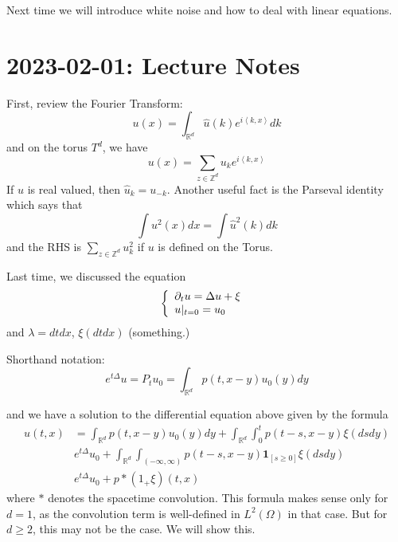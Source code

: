 \documentclass{article}
\def\R{\mathbb{R}} %
\def\Z{\mathbb{Z}} %
\begin{document}
Next time we will introduce white noise and how to deal with linear equations.
\section{2023-02-01: Lecture Notes}
First, review the Fourier Transform:
\begin{equation*}
  u(x) = \int_{\R^d } \hat{u}(k)e^{i \left\langle k,x \right\rangle} dk
\end{equation*}
and on the torus $T^{d}$, we have
\begin{equation*}
  u(x) = \sum_{z\in \Z^{d}} u_{k}e^{i \left\langle k,x \right\rangle}
\end{equation*}
If $u$ is real valued, then $\hat{u}_{k}=u_{-k}$. Another useful fact is the
Parseval identity which says that
\begin{equation*}
  \int u^{2}(x)dx =  
  \int \hat{u}^{2}(k)dk
\end{equation*}
and the RHS is $\sum_{z\in \Z^{d}}u_{k}^{2}$ if $u$ is defined on the Torus.

Last time, we discussed the equation
\begin{equation*}
  \left\{ \begin{array}{l@{\quad}l} \partial_{t}u =\Delta u+\xi \\
    u|_{t=0}=u_{0}\end{array}\right.
\end{equation*}
and $\lambda=dtdx$, $\xi(dtdx) $ (something.) 

Shorthand notation:
\begin{equation*}
  e^{t\Delta }u = P_{t}u_{0}= \int_{\R^d } p(t,x-y)u_{0}(y)dy 
\end{equation*}

and we have a solution to the differential equation above given by the formula
\begin{align*}
  u(t,x)
  &= \int_{\R^d }p(t,x-y) u_{0}(y)dy + \int_{\R^d }\int_{0}^{t}p(t-s,x-y)  \xi(dsdy)\\
  & e^{t\Delta }u_{0} + \int_{\R^d }\int_{(-\infty,\infty)}p(t-s,x-y)\mathbf{1}_{\left[ s \geq 0\right] }\xi(dsdy)\\
  & e^{t\Delta }u_{0} + p*(1_{+}\xi)(t,x)
\end{align*}
where $*$ denotes the spacetime convolution. This formula makes sense only for
$d=1$, as the convolution term is well-defined in $L^{2}(\Omega)$ in that case.
But for $d \geq 2$, this may not be the case. We will show this.
\end{document}
